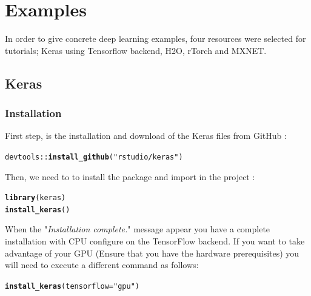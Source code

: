 \documentclass[6pt,letter]{article}\usepackage[]{graphicx}\usepackage[]{color}
\makeatletter
\newcommand{\hlstr}[1]{\textcolor[rgb]{0.192,0.494,0.8}{#1}}%
\newcommand{\hlopt}[1]{\textcolor[rgb]{0,0,0}{#1}}%
\newcommand{\hlstd}[1]{\textcolor[rgb]{0.345,0.345,0.345}{#1}}%
\newcommand{\hlkwc}[1]{\textcolor[rgb]{0.333,0.667,0.333}{#1}}%
\newcommand{\hlkwd}[1]{\textcolor[rgb]{0.737,0.353,0.396}{\textbf{#1}}}%
\newenvironment{kframe}{%
 \def\at@end@of@kframe{}%
 \ifinner\ifhmode%
  \def\at@end@of@kframe{\end{minipage}}%
  \begin{minipage}{\columnwidth}%
 \fi\fi%
 \def\FrameCommand##1{\hskip\@totalleftmargin \hskip-\fboxsep
 \colorbox{shadecolor}{##1}\hskip-\fboxsep
     \hskip-\linewidth \hskip-\@totalleftmargin \hskip\columnwidth}%
 \MakeFramed {\advance\hsize-\width
   \@totalleftmargin\z@ \linewidth\hsize
   \@setminipage}}%
 {\par\unskip\endMakeFramed%
 \at@end@of@kframe}
\newenvironment{knitrout}{}{} %
\makeatother
\begin{document}
\section{Examples}
\label{sec:examples}
In order to give concrete deep learning examples, four resources were selected for tutorials; Keras using Tensorflow backend, H2O, rTorch and MXNET.

\subsection{Keras}
\subsubsection{Installation}
First step, is the installation and download of the Keras files from GitHub :
\begin{knitrout}
\color{fgcolor}\begin{kframe}
\begin{alltt}
\hlstd{devtools}\hlopt{::}\hlkwd{install_github}\hlstd{(}\hlstr{"rstudio/keras"}\hlstd{)}
\end{alltt}
\end{kframe}
\end{knitrout}
Then, we need to to install the package and import in the project :
\begin{knitrout}
\color{fgcolor}\begin{kframe}
\begin{alltt}
\hlkwd{library}\hlstd{(keras)}
\hlkwd{install_keras}\hlstd{()}
\end{alltt}
\end{kframe}
\end{knitrout}
When the "\textit{Installation complete.}" message appear you have a complete installation with CPU configure on the TensorFlow backend.
If you want to take advantage of your GPU (Ensure that you have the hardware prerequisites) you will need to execute a different command as follows:
\begin{knitrout}
\color{fgcolor}\begin{kframe}
\begin{alltt}
\hlkwd{install_keras}\hlstd{(}\hlkwc{tensorflow} \hlstd{=} \hlstr{"gpu"}\hlstd{)}
\end{alltt}
\end{kframe}
\end{knitrout}
\end{document}
